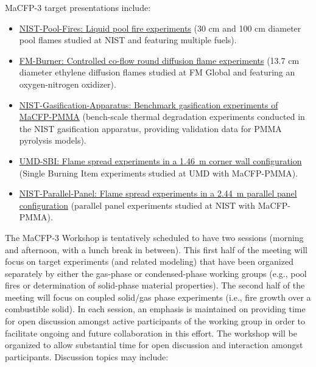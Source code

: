 \documentclass[12pt]{article}
\begin{document}
MaCFP-3 target presentations include:
\begin{itemize}[noitemsep]
\item \href{https://github.com/MaCFP/macfp-db/tree/master/Liquid_Pool_Fires/NIST_Pool_Fires}{NIST-Pool-Fires: Liquid pool fire experiments} (30 cm and 100 cm diameter pool flames studied at NIST and featuring multiple fuels).
\item \href{https://github.com/MaCFP/macfp-db/tree/master/Extinction/FM_Burner}{FM-Burner: Controlled co-flow round diffusion flame experiments} (13.7 cm diameter ethylene diffusion flames studied at FM Global and featuring an oxygen-nitrogen oxidizer).
\item \href{https://github.com/MaCFP/matl-db/tree/master/PMMA/Validation_Data/NIST_Gasification_Apparatus}{NIST-Gasification-Apparatus: Benchmark gasification experiments of MaCFP-PMMA} (bench-scale thermal degradation experiments conducted in the NIST gasification apparatus, providing validation data for PMMA pyrolysis models).
\item \href{https://github.com/MaCFP/macfp-db/tree/master/Fire_Growth/UMD_SBI}{UMD-SBI: Flame spread experiments in a 1.46~m corner wall configuration} (Single Burning Item experiments studied at UMD with MaCFP-PMMA).
\item \href{https://github.com/MaCFP/macfp-db/tree/master/Fire_Growth/NIST_Parallel_Panel}{NIST-Parallel-Panel: Flame spread experiments in a 2.44~m parallel panel configuration} (parallel panel experiments studied at NIST with MaCFP-PMMA).
 \end{itemize}
 
The MaCFP-3 Workshop is tentatively scheduled to have two sessions (morning and afternoon, with a lunch break in between). This first half of the meeting will focus on target experiments (and related modeling) that have been organized separately by either the gas-phase or condensed-phase working groups (e.g., pool fires or determination of solid-phase material properties). The second half of the meeting will focus on coupled solid/gas phase experiments (i.e., fire growth over a combustible solid). In each session, an emphasis is maintained on providing time for open discussion amongst active participants of the working group in order to facilitate ongoing and future collaboration in this effort. The workshop will be organized to allow substantial time for open discussion and interaction amongst participants. Discussion topics may include:
\end{document}
